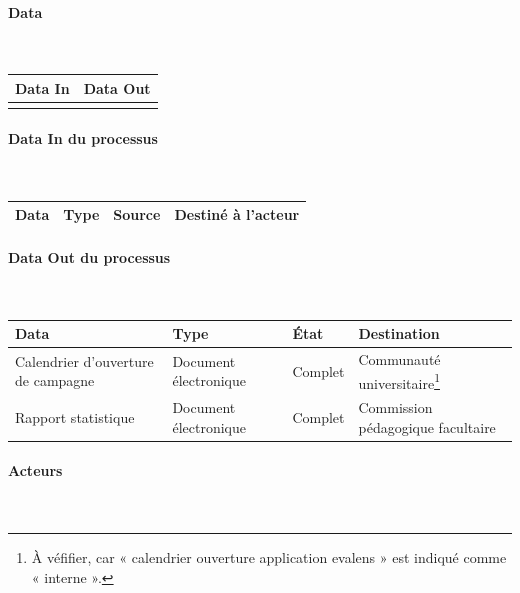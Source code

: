 \documentclass[a4paper,11pt]{report}
\begin{document}

\paragraph{Data}~\newline{}

\begin{tabularx}{\linewidth}{|X|X|} \hline
Data In & Data Out \\ \hline
 & \\ \hline
\end{tabularx}

\paragraph{Data In du processus}~\newline{}

\begin{tabularx}{\linewidth}{|X|X|X|X|} \hline
Data & Type & Source & Destiné à l'acteur \\ \hline

\end{tabularx}

\paragraph{Data Out du processus}~\newline{}

\begin{tabularx}{\linewidth}{|X|X|X|X|} \hline
Data & Type & État & Destination \\ \hline
Calendrier d'ouverture de campagne & Document électronique & Complet & Communauté universitaire\footnote{À véfifier, car « calendrier ouverture application evalens » est indiqué comme « interne ».} \\
Rapport statistique & Document électronique & Complet & Commission pédagogique facultaire \\ \hline
\end{tabularx}

\paragraph{Acteurs}~\newline{}
\end{document}
